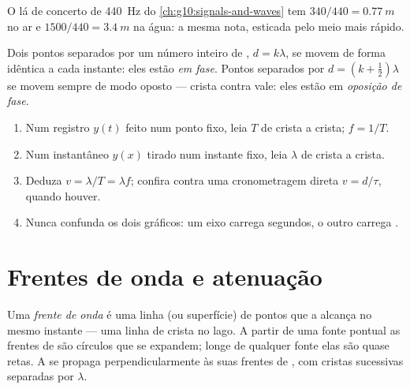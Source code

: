 \begin{example}\label{ex:g12:mechanical-waves:concertA}
O lá de concerto de \qty{440}{Hz} do \cref{ch:g10:signals-and-waves} tem
 $340/440 = \qty{0.77}{m}$ no ar e
$1500/440 = \qty{3.4}{m}$ na água: a mesma nota, esticada pelo meio mais
rápido.
\end{example}

\begin{definition}\label{def:g12:mechanical-waves:phase}
Dois pontos separados por um número inteiro de ,
$d = k\lambda$, se movem de forma idêntica a cada instante: eles estão
\emph{em fase}. Pontos separados por
$d = (k + \tfrac12)\lambda$ se movem sempre de modo oposto --- crista
contra vale: eles estão em \emph{oposição de fase}.
\end{definition}

\begin{method}\label{met:g12:mechanical-waves:reading}
\begin{enumerate}
  \item Num registro $y(t)$ feito num ponto fixo, leia $T$ de crista a
        crista; $f = 1/T$.
  \item Num instantâneo $y(x)$ tirado num instante fixo, leia $\lambda$
        de crista a crista.
  \item Deduza $v = \lambda/T = \lambda f$; confira contra uma
        cronometragem direta $v = d/\tau$, quando houver.
  \item Nunca confunda os dois gráficos: um eixo carrega segundos, o
        outro carrega .
\end{enumerate}
\end{method}

\section{Frentes de onda e atenuação}

\begin{definition}\label{def:g12:mechanical-waves:wavefront}
Uma \emph{frente de onda} é uma linha (ou
superfície) de pontos que a  alcança no mesmo instante --- uma linha
de crista no lago. A partir de uma fonte pontual as frentes de  são
círculos que se expandem; longe de qualquer fonte elas são quase retas. A
 se propaga perpendicularmente às suas frentes de , com cristas
sucessivas separadas por $\lambda$.
\end{definition}

